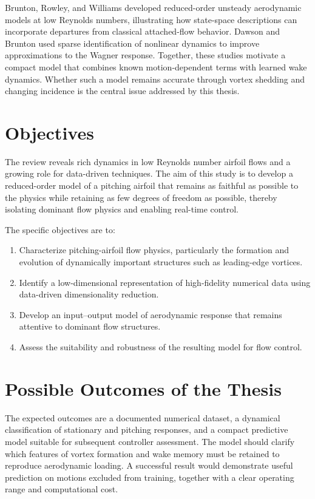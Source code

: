 Brunton, Rowley, and Williams \cite{brunton2013} developed reduced-order unsteady aerodynamic models at low Reynolds numbers, illustrating how state-space descriptions can incorporate departures from classical attached-flow behavior. Dawson and Brunton \cite{dawson} used sparse identification of nonlinear dynamics to improve approximations to the Wagner response. Together, these studies motivate a compact model that combines known motion-dependent terms with learned wake dynamics. Whether such a model remains accurate through vortex shedding and changing incidence is the central issue addressed by this thesis.

\section{Objectives}
The review reveals rich dynamics in low Reynolds number airfoil flows and a growing role for data-driven techniques. The aim of this study is to develop a reduced-order model of a pitching airfoil that remains as faithful as possible to the physics while retaining as few degrees of freedom as possible, thereby isolating dominant flow physics and enabling real-time control.

The specific objectives are to:
\begin{enumerate}
\item Characterize pitching-airfoil flow physics, particularly the formation and evolution of dynamically important structures such as leading-edge vortices.
\item Identify a low-dimensional representation of high-fidelity numerical data using data-driven dimensionality reduction.
\item Develop an input--output model of aerodynamic response that remains attentive to dominant flow structures.
\item Assess the suitability and robustness of the resulting model for flow control.
\end{enumerate}



\section{Possible Outcomes of the Thesis}
The expected outcomes are a documented numerical dataset, a dynamical classification of stationary and pitching responses, and a compact predictive model suitable for subsequent controller assessment. The model should clarify which features of vortex formation and wake memory must be retained to reproduce aerodynamic loading. A successful result would demonstrate useful prediction on motions excluded from training, together with a clear operating range and computational cost.


